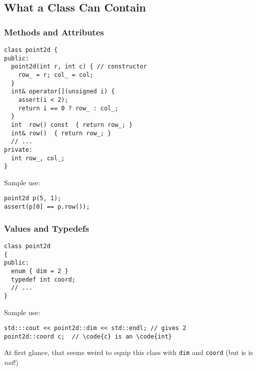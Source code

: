 \documentclass{beamer}
\newcommand{\code}[1]{{\scriptsize{\texttt{#1}}}\xspace}
\begin{document}
\subsection{What a Class Can Contain}



\begin{frame}[fragile]
  \frametitle{Methods and Attributes}

\begin{lstlisting}
class point2d {
public:
  point2d(int r, int c) { // constructor
    row_ = r; col_ = col;
  }
  int& operator[](unsigned i) {
    assert(i < 2);
    return i == 0 ? row_ : col_;
  }
  int  row() const  { return row_; }
  int& row()  { return row_; }
  // ...
private:
  int row_, col_;
}
\end{lstlisting}

Sample use:
\begin{lstlisting}
point2d p(5, 1);
assert(p[0] == p.row());
\end{lstlisting}

\end{frame}



\begin{frame}[fragile]
  \frametitle{Values and Typedefs}


\begin{lstlisting}
class point2d
{
public:
  enum { dim = 2 }
  typedef int coord;
  // ...
}
\end{lstlisting}

Sample use:
\begin{lstlisting}
std:::cout << point2d::dim << std::endl; // gives 2
point2d::coord c;  // \code{c} is an \code{int}
\end{lstlisting}

{\scriptsize
At first glance, that seems weird to equip this class with \code{dim}
and \code{coord} (but is is \emph{not}!)
}

\end{frame}
\end{document}
